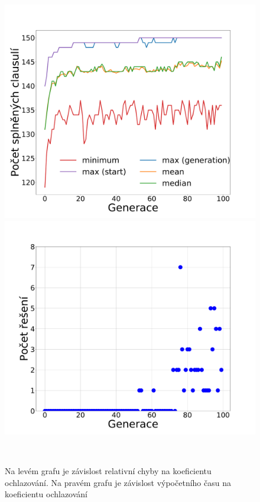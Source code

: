 \documentclass[11pt]{article}
\begin{document}
 
\begin{figure}
	\centering
    \begin{minipage}[c]{0.42\textwidth}
        \centering\includegraphics[width=\textwidth]{img/1c.pdf} 
    \end{minipage}
    \begin{minipage}[c]{0.42\textwidth}
        \centering \includegraphics[width=\textwidth]{img/1s.pdf} 
    \end{minipage}
    \\
   \caption{Na levém grafu je závislost relativní chyby na koeficientu ochlazování. Na pravém grafu je závislost výpočetního času na koeficientu ochlazování}\label{fig:GZNK}
\end{figure} 
\end{document}
